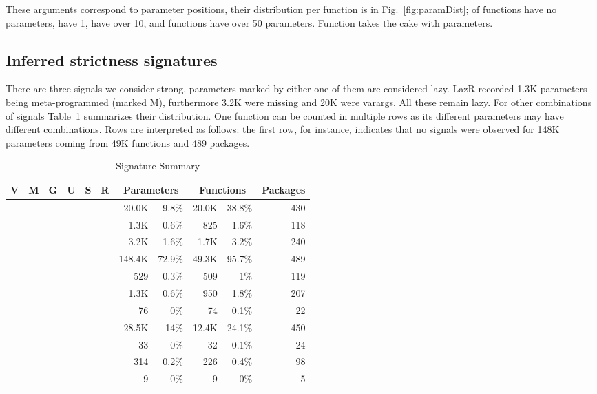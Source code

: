 \documentclass[review,creen,acmsmall]{acmart}
\newcommand{\xmark}{\textcolor{red}{\ding{55}}}
\newcommand{\cmark}{\textcolor{green}{\ding{51}}}
\newcommand{\lazr}{{\sf LazR}\xspace}
\begin{document}
These arguments correspond to \TotalParameterCount parameter positions, their
distribution per function is in Fig.~\ref{fig:paramDist}; \ZeroArityFunctionPerc
of functions have no parameters, \OneArityFunctionPerc have 1,
\TenArityFunctionPerc have over 10, and \FiftyArityFunctionCount functions have
over 50 parameters. Function \texttt{\MaxArityFunctionName} takes the cake with
\texttt{\MaxArityFunctionParamCount} parameters.

\subsection{Inferred strictness signatures}\label{sec:results}

There are three signals we consider strong, parameters marked by either one of
them are considered lazy. \lazr recorded 1.3K parameters being meta-programmed
(marked M), furthermore 3.2K were missing and 20K were varargs. All these remain
lazy. For other combinations of signals Table~\ref{table:strictdist} summarizes
their distribution. One function can be counted in multiple rows as its
different parameters may have different combinations. Rows are interpreted as
follows: the first row, for instance, indicates that no signals were observed
for 148K parameters coming from 49K functions and 489 packages.

\begin{table}[!h] \small
  \caption{Signature Summary} \label{table:strictdist} \centering
  \begin{tabular}{ccccccrrrrr}\toprule
    \bf V&\bf M&\bf G&\bf U&\bf S&\bf R&\multicolumn{2}{c}{\textbf{Parameters}} &\multicolumn{2}{c}{\textbf{Functions}}&\bf Packages\\\midrule
    \cmark{}&\xmark{}&\xmark{}&\xmark{}&\xmark{}&\xmark{}&20.0K&9.8\%&20.0K&38.8\%&430\\
    \xmark{}&\cmark{}&\xmark{}&\xmark{}&\xmark{}&\xmark{}&1.3K&0.6\%&825&1.6\%&118\\
    \xmark{}&\xmark{}&\cmark{}&\xmark{}&\xmark{}&\xmark{}&3.2K&1.6\%&1.7K&3.2\%&240\\
    \xmark{}&\xmark{}&\xmark{}&\xmark{}&\xmark{}&\xmark{}&148.4K&72.9\%&49.3K&95.7\%&489\\
    \xmark{}&\xmark{}&\xmark{}&\xmark{}&\xmark{}&\cmark{}&529&0.3\%&509&1\%&119\\
    \xmark{}&\xmark{}&\xmark{}&\xmark{}&\cmark{}&\xmark{}&1.3K&0.6\%&950&1.8\%&207\\
    \xmark{}&\xmark{}&\xmark{}&\xmark{}&\cmark{}&\cmark{}&76&0\%&74&0.1\%&22\\
    \xmark{}&\xmark{}&\xmark{}&\cmark{}&\xmark{}&\xmark{}&28.5K&14\%&12.4K&24.1\%&450\\
    \xmark{}&\xmark{}&\xmark{}&\cmark{}&\xmark{}&\cmark{}&33&0\%&32&0.1\%&24\\
    \xmark{}&\xmark{}&\xmark{}&\cmark{}&\cmark{}&\xmark{}&314&0.2\%&226&0.4\%&98\\
    \xmark{}&\xmark{}&\xmark{}&\cmark{}&\cmark{}&\cmark{}&9&0\%&9&0\%&5\\
    \bottomrule
  \end{tabular}
\end{table}
\end{document}

